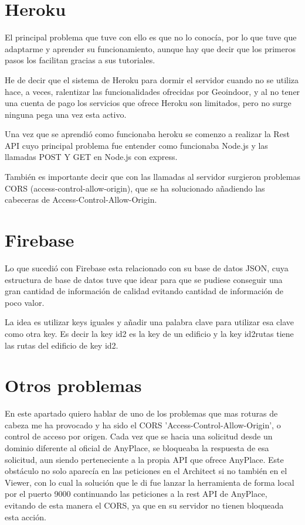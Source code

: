 \section{Heroku}\label{heroku5}

El principal problema que tuve con ello es que no lo conocía, por lo que tuve que adaptarme y aprender su funcionamiento, aunque hay que decir que los primeros pasos los facilitan gracias a sus tutoriales.

He de decir que el sistema de Heroku para dormir el servidor cuando no se utiliza hace, a veces, ralentizar las funcionalidades ofrecidas por Geoindoor, y al no tener una cuenta de pago los servicios que ofrece Heroku son limitados, pero no surge ninguna pega una vez esta activo. 

Una vez que se aprendió como funcionaba heroku se comenzo a realizar la Rest API cuyo principal problema fue entender como funcionaba Node.js y las llamadas POST Y GET en Node.js con express.

También es importante decir que con las llamadas al servidor surgieron problemas CORS (access-control-allow-origin),
que se ha solucionado añadiendo las cabeceras de Access-Control-Allow-Origin. 

\section{Firebase}\label{firebase5}

Lo que sucedió con Firebase esta relacionado con su base de datos JSON, cuya estructura de base de datos tuve que idear para que se pudiese conseguir una gran cantidad de información de calidad evitando cantidad de información de poco valor.

La idea es utilizar keys iguales y añadir una palabra clave para utilizar esa clave como otra key. Es decir la key id2 es la key de un edificio y la key id2rutas tiene las rutas del edificio de key id2.


\section{Otros problemas}\label{otros}

En este apartado quiero hablar de uno de los problemas que mas roturas de cabeza me ha provocado y ha sido el CORS 'Access-Control-Allow-Origin', o control de acceso por origen. Cada vez que se hacia una solicitud desde un dominio diferente al oficial de AnyPlace, se bloqueaba la respuesta de esa solicitud, aun siendo perteneciente a la propia API que ofrece AnyPlace. Este obstáculo no solo aparecía en las peticiones en el Architect si no también en el Viewer, con lo cual la solución que le di fue lanzar la herramienta de forma local por el puerto 9000 continuando las peticiones a la rest API de AnyPlace, evitando de esta manera el CORS, ya que en su servidor no tienen bloqueada esta acción.

